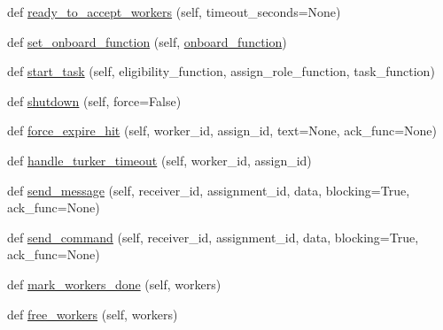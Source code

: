 \begin{DoxyCompactItemize}
\item 
def \hyperlink{classparlai_1_1mturk_1_1core_1_1legacy__2018_1_1mturk__manager_1_1MTurkManager_ac91c9354be146571c709509c81a05863}{ready\+\_\+to\+\_\+accept\+\_\+workers} (self, timeout\+\_\+seconds=None)
\item 
def \hyperlink{classparlai_1_1mturk_1_1core_1_1legacy__2018_1_1mturk__manager_1_1MTurkManager_a4b2ab329a662bf586c2f46134e956241}{set\+\_\+onboard\+\_\+function} (self, \hyperlink{classparlai_1_1mturk_1_1core_1_1legacy__2018_1_1mturk__manager_1_1MTurkManager_a65d07effb184c648b952ae3a81bcf57d}{onboard\+\_\+function})
\item 
def \hyperlink{classparlai_1_1mturk_1_1core_1_1legacy__2018_1_1mturk__manager_1_1MTurkManager_a201aff5240479a785e32e52de1c374f8}{start\+\_\+task} (self, eligibility\+\_\+function, assign\+\_\+role\+\_\+function, task\+\_\+function)
\item 
def \hyperlink{classparlai_1_1mturk_1_1core_1_1legacy__2018_1_1mturk__manager_1_1MTurkManager_a53cf3916f467b39b52c6c4e5c619b451}{shutdown} (self, force=False)
\item 
def \hyperlink{classparlai_1_1mturk_1_1core_1_1legacy__2018_1_1mturk__manager_1_1MTurkManager_ad9c96da368b11cda593782cbbdadd940}{force\+\_\+expire\+\_\+hit} (self, worker\+\_\+id, assign\+\_\+id, text=None, ack\+\_\+func=None)
\item 
def \hyperlink{classparlai_1_1mturk_1_1core_1_1legacy__2018_1_1mturk__manager_1_1MTurkManager_a063d73cb868b1adbd0a5542f8558f92c}{handle\+\_\+turker\+\_\+timeout} (self, worker\+\_\+id, assign\+\_\+id)
\item 
def \hyperlink{classparlai_1_1mturk_1_1core_1_1legacy__2018_1_1mturk__manager_1_1MTurkManager_a37d88dd1724fcbb3693fbb12d4d04976}{send\+\_\+message} (self, receiver\+\_\+id, assignment\+\_\+id, data, blocking=True, ack\+\_\+func=None)
\item 
def \hyperlink{classparlai_1_1mturk_1_1core_1_1legacy__2018_1_1mturk__manager_1_1MTurkManager_a6b43f0d326a90ffa3aab0a94699b95e0}{send\+\_\+command} (self, receiver\+\_\+id, assignment\+\_\+id, data, blocking=True, ack\+\_\+func=None)
\item 
def \hyperlink{classparlai_1_1mturk_1_1core_1_1legacy__2018_1_1mturk__manager_1_1MTurkManager_a6d392de0d47014a0433ea7e996900b13}{mark\+\_\+workers\+\_\+done} (self, workers)
\item 
def \hyperlink{classparlai_1_1mturk_1_1core_1_1legacy__2018_1_1mturk__manager_1_1MTurkManager_a45680f29b43769ad4f69be1ecffa1def}{free\+\_\+workers} (self, workers)

\end{DoxyCompactItemize}
